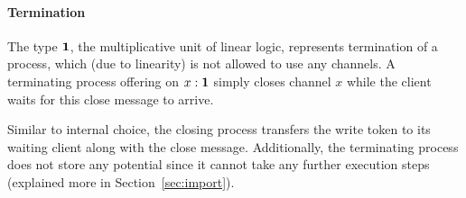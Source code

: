 \paragraph*{\textbf{Termination}}
The type $\mathbf{1}$, the multiplicative unit of linear logic, represents
termination of a process, which (due to linearity) is not allowed to use
any channels. A terminating process offering on $x : \mathbf{1}$ simply
closes channel $x$ while the client waits for this close message to arrive.
Similar to internal choice, the closing process transfers the write
token to its waiting client along with the close message.
Additionally, the terminating process does not store
any potential since it cannot take any further execution steps
(explained more in Section~\ref{sec:import}).


